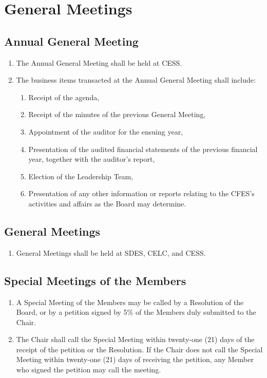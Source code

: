 \section{General Meetings}
\label{general-meetings}

\subsection{Annual General Meeting}
\label{general-meetings-annual-general-meeting}

\begin{enumerate}
 \item The Annual General Meeting shall be held at CESS.
 \item The business items transacted at the Annual General Meeting shall include:
  \begin{enumerate}
   \item Receipt of the agenda,
   \item Receipt of the minutes of the previous General Meeting,
   \item Appointment of the auditor for the ensuing year,
   \item Presentation of the audited financial statements of the previous financial year, together with the auditor's report,
   \item Election of the Leadership Team,
   \item Presentation of any other information or reports relating to the CFES's activities and affairs as the Board may determine.
  \end{enumerate}
\end{enumerate}

\subsection{General Meetings}
\label{general-meetings-general-meetings}

\begin{enumerate}
 \item General Meetings shall be held at SDES, CELC, and CESS.
\end{enumerate}

\subsection{Special Meetings of the Members}
\label{general-meetings-special-meetings-of-the-members}

\begin{enumerate}
 \item A Special Meeting of the Members may be called by a Resolution of the Board, or by a petition signed by 5\% of the Members duly submitted to the Chair.
 \item The Chair shall call the Special Meeting within twenty-one (21) days of the receipt of the petition or the Resolution. If the Chair does not call the Special Meeting within twenty-one (21) days of receiving the petition, any Member who signed the petition may call the meeting.
\end{enumerate}
